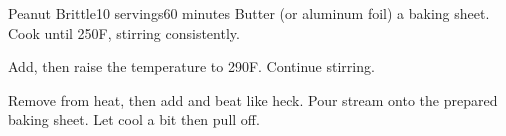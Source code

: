 \documentclass[../Cookbook.tex]{subfiles}
\begin{document}
\begin{recipe}[PeanutBrittle]{Peanut Brittle}{10 servings}{60 minutes}
Butter (or aluminum foil) a baking sheet.
Cook until 250\0F, stirring consistently.

Add, then raise the temperature to 290\0F. Continue stirring.

Remove from heat, then add and beat like heck.
Pour stream onto the prepared baking sheet. Let cool a bit then pull off.
\end{recipe}
\end{document}
